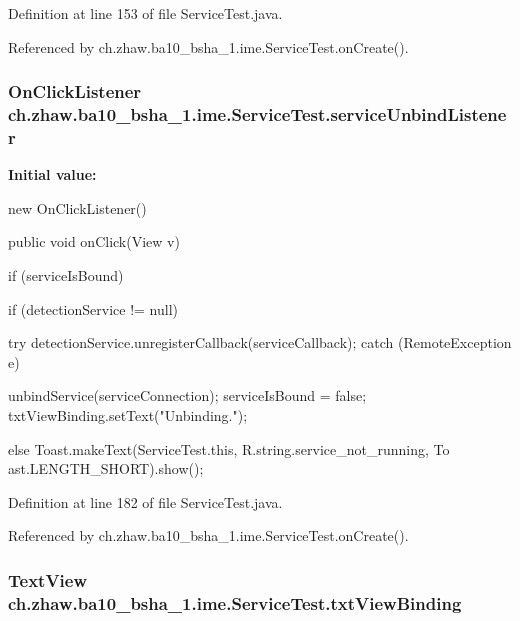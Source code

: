 Definition at line 153 of file ServiceTest.java.

Referenced by ch.zhaw.ba10\_\-bsha\_\-1.ime.ServiceTest.onCreate().\hypertarget{classch_1_1zhaw_1_1ba10__bsha__1_1_1ime_1_1ServiceTest_aa8c033e5421b4479f79d96f776aef94b}{
\subsubsection[{serviceUnbindListener}]{\setlength{\rightskip}{0pt plus 5cm}OnClickListener {\bf ch.zhaw.ba10\_\-bsha\_\-1.ime.ServiceTest.serviceUnbindListener}}}
\label{classch_1_1zhaw_1_1ba10__bsha__1_1_1ime_1_1ServiceTest_aa8c033e5421b4479f79d96f776aef94b}
{\bfseries Initial value:}
\begin{DoxyCode}
 new OnClickListener() {
        public void onClick(View v) {
            if (serviceIsBound) {
                
                
                if (detectionService != null) {
                    try {
                        detectionService.unregisterCallback(serviceCallback);
                    } catch (RemoteException e) {
                        
                        
                    }
                }
                
                
                unbindService(serviceConnection);
                serviceIsBound = false;
                txtViewBinding.setText("Unbinding.");
            } else {
                Toast.makeText(ServiceTest.this, R.string.service_not_running, To
      ast.LENGTH_SHORT).show();
            }
        }
    }
\end{DoxyCode}


Definition at line 182 of file ServiceTest.java.

Referenced by ch.zhaw.ba10\_\-bsha\_\-1.ime.ServiceTest.onCreate().\hypertarget{classch_1_1zhaw_1_1ba10__bsha__1_1_1ime_1_1ServiceTest_a3c1a17a86c78afadef203bdfee113859}{
\subsubsection[{txtViewBinding}]{\setlength{\rightskip}{0pt plus 5cm}TextView {\bf ch.zhaw.ba10\_\-bsha\_\-1.ime.ServiceTest.txtViewBinding}}}
\label{classch_1_1zhaw_1_1ba10__bsha__1_1_1ime_1_1ServiceTest_a3c1a17a86c78afadef203bdfee113859}


